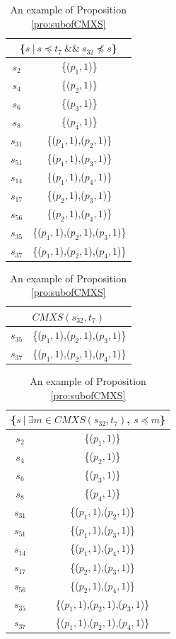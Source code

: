  \begin{table}[htbp]
  \centering
  \caption{An example of Proposition \ref{pro:subofCMXS}}
  \label{examleOfCMXSPro}
    \begin{tabular}{|c|c|} \hline
     \multicolumn{2}{|c|}{\{$s\ |\ s \preceq t_{7}\ \&\&\ s_{32} \npreceq s$\}} \\ \hline
   $s_{2}$ & \{($p_{1}, 1$)\} \\
   $s_{4}$ & \{($p_{2}, 1$)\} \\
   $s_{6}$ & \{($p_{3}, 1$)\} \\
   $s_{8}$ & \{($p_{4}, 1$)\} \\
   $s_{31}$ & \{($p_{1}, 1$),($p_{2}, 1$)\} \\
   
   $s_{51}$ & \{($p_{1}, 1$),($p_{3}, 1$)\} \\
   $s_{14}$ & \{($p_{1}, 1$),($p_{4}, 1$)\} \\
   $s_{17}$ & \{($p_{2}, 1$),($p_{3}, 1$)\} \\
   $s_{56}$ & \{($p_{2}, 1$),($p_{4}, 1$)\} \\
   
   $s_{35}$ & \{($p_{1}, 1$),($p_{2}, 1$),($p_{3}, 1$)\} \\
   $s_{37}$ & \{($p_{1}, 1$),($p_{2}, 1$),($p_{4}, 1$)\} \\   \hline
    \end{tabular}%
\quad
    \begin{tabular}{|c|c|} \hline
     \multicolumn{2}{|c|}{$CMXS(s_{32}, t_{7})$} \\ \hline
   $s_{35}$ & \{($p_{1}, 1$),($p_{2}, 1$),($p_{3}, 1$)\} \\
   $s_{37}$ & \{($p_{1}, 1$),($p_{2}, 1$),($p_{4}, 1$)\} \\ \hline
    \end{tabular}%
\quad
    \begin{tabular}{|c|c|} \hline
   \multicolumn{2}{|c|}{\{$ s\ |\ \exists m \in CMXS(s_{32}, t_{7})$, $s \preceq m$\}}\\ \hline
   $s_{2}$ & \{($p_{1}, 1$)\} \\
   $s_{4}$ & \{($p_{2}, 1$)\} \\
   $s_{6}$ & \{($p_{3}, 1$)\} \\
   $s_{8}$ & \{($p_{4}, 1$)\} \\
   $s_{31}$ & \{($p_{1}, 1$),($p_{2}, 1$)\} \\
   
   $s_{51}$ & \{($p_{1}, 1$),($p_{3}, 1$)\} \\
   $s_{14}$ & \{($p_{1}, 1$),($p_{4}, 1$)\} \\
   $s_{17}$ & \{($p_{2}, 1$),($p_{3}, 1$)\} \\
   $s_{56}$ & \{($p_{2}, 1$),($p_{4}, 1$)\} \\
   
   $s_{35}$ & \{($p_{1}, 1$),($p_{2}, 1$),($p_{3}, 1$)\} \\
   $s_{37}$ & \{($p_{1}, 1$),($p_{2}, 1$),($p_{4}, 1$)\} \\
   \hline
    \end{tabular}%
\end{table}

